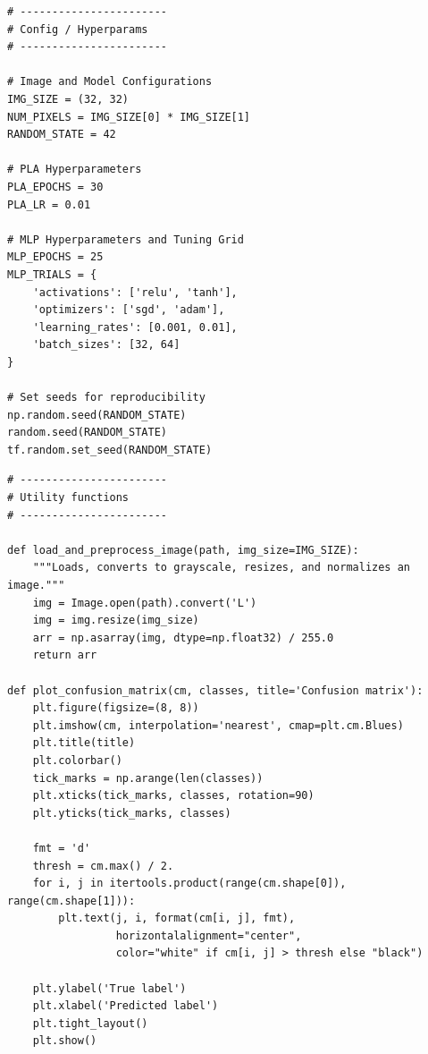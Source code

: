 \documentclass[11pt]{article}
\begin{document}
\begin{verbatim}
# -----------------------
# Config / Hyperparams
# -----------------------

# Image and Model Configurations
IMG_SIZE = (32, 32)
NUM_PIXELS = IMG_SIZE[0] * IMG_SIZE[1]
RANDOM_STATE = 42

# PLA Hyperparameters
PLA_EPOCHS = 30
PLA_LR = 0.01

# MLP Hyperparameters and Tuning Grid
MLP_EPOCHS = 25
MLP_TRIALS = {
    'activations': ['relu', 'tanh'],
    'optimizers': ['sgd', 'adam'],
    'learning_rates': [0.001, 0.01],
    'batch_sizes': [32, 64]
}

# Set seeds for reproducibility
np.random.seed(RANDOM_STATE)
random.seed(RANDOM_STATE)
tf.random.set_seed(RANDOM_STATE)

\end{verbatim}
\vspace{0.4cm}
\begin{verbatim}
# -----------------------
# Utility functions
# -----------------------

def load_and_preprocess_image(path, img_size=IMG_SIZE):
    """Loads, converts to grayscale, resizes, and normalizes an image."""
    img = Image.open(path).convert('L')
    img = img.resize(img_size)
    arr = np.asarray(img, dtype=np.float32) / 255.0
    return arr

def plot_confusion_matrix(cm, classes, title='Confusion matrix'):
    plt.figure(figsize=(8, 8))
    plt.imshow(cm, interpolation='nearest', cmap=plt.cm.Blues)
    plt.title(title)
    plt.colorbar()
    tick_marks = np.arange(len(classes))
    plt.xticks(tick_marks, classes, rotation=90)
    plt.yticks(tick_marks, classes)

    fmt = 'd'
    thresh = cm.max() / 2.
    for i, j in itertools.product(range(cm.shape[0]), range(cm.shape[1])):
        plt.text(j, i, format(cm[i, j], fmt),
                 horizontalalignment="center",
                 color="white" if cm[i, j] > thresh else "black")

    plt.ylabel('True label')
    plt.xlabel('Predicted label')
    plt.tight_layout()
    plt.show()
\end{verbatim}
\vspace{0.4cm}
\end{document}
